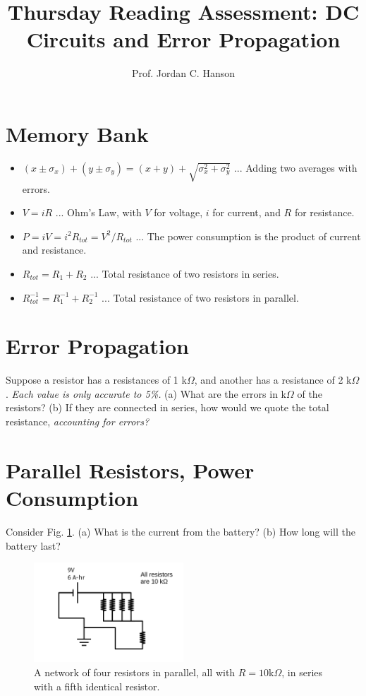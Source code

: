 \documentclass{article}
\begin{document}
\title{Thursday Reading Assessment: DC Circuits and Error Propagation}
\author{Prof. Jordan C. Hanson}

\maketitle

\section{Memory Bank}

\begin{itemize}
\item $(x \pm \sigma_x) + (y \pm \sigma_y) = (x+y) + \sqrt{\sigma_x^2 + \sigma_y^2}$ ... Adding two averages with errors.
\item $V = i R$ ... Ohm's Law, with $V$ for voltage, $i$ for current, and $R$ for resistance.
\item $P = iV = i^2 R_{tot} = V^2/R_{tot}$ ... The power consumption is the product of current and resistance.
\item $R_{tot} = R_1 + R_2$ ... Total resistance of two resistors in series.
\item $R_{tot}^{-1} = R_1^{-1} + R_2^{-1}$ ... Total resistance of two resistors in parallel.
\end{itemize}

\section{Error Propagation}

Suppose a resistor has a resistances of 1 k$\Omega$, and another has a resistance of 2 k$\Omega$.  \textit{Each value is only accurate to 5\%.}  (a) What are the errors in k$\Omega$ of the resistors? (b) If they are connected in series, how would we quote the total resistance, \textit{accounting for errors?} \\ \vspace{2cm}

\section{Parallel Resistors, Power Consumption}

Consider Fig. \ref{fig:1}.  (a) What is the current from the battery? (b) How long will the battery last?

\begin{figure}
\centering
\includegraphics[width=0.5\textwidth]{figures/circuitExample5.pdf}
\caption{\label{fig:1}  A network of four resistors in parallel, all with $R = 10$k$\Omega$, in series with a fifth identical resistor.}
\end{figure}
\end{document}
